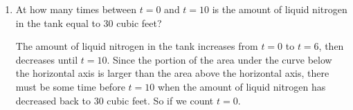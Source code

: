 \documentclass{article}
\begin{document}
\begin{enumerate}
\begin{enumerate}
  \item
    \begin{problem}[\vfill]
      At how many times between $t = 0$ and $t = 10$ is the amount of
      liquid nitrogen in the tank equal to 30 cubic feet?
    \end{problem}

    \begin{solution}
      The amount of liquid nitrogen in the tank increases from $t=0$ to
      $t=6$, then decreases until $t=10$. Since the portion of the area 
      under the curve below the horizontal axis is larger than the area 
      above the horizontal axis, there must be some time before $t=10$ when
      the amount of liquid nitrogen has decreased back to $30$ cubic feet.
      So  if we count $t=0$.
    \end{solution}




\end{enumerate}
\end{enumerate}
\end{document}
